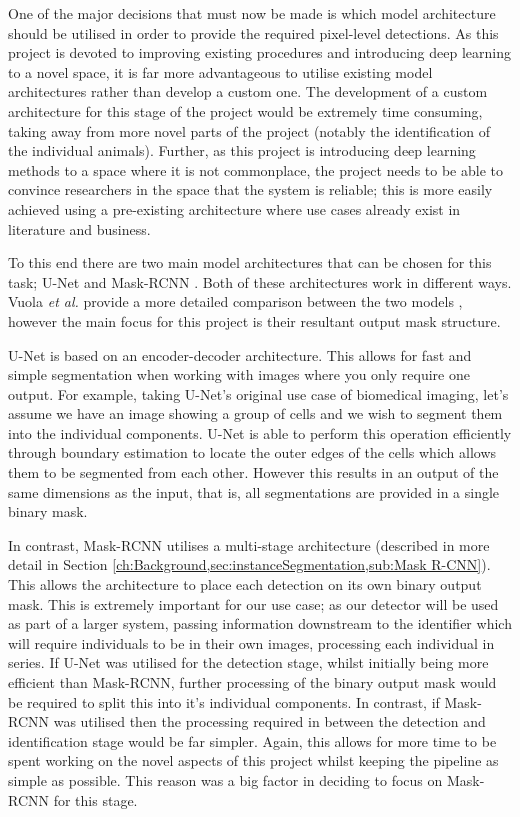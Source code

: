 One of the major decisions that must now be made is which model architecture should be utilised in order to provide the required pixel-level detections. As this project is devoted to improving existing procedures and introducing deep learning to a novel space, it is far more advantageous to utilise existing model architectures rather than develop a custom one. The development of a custom architecture for this stage of the project would be extremely time consuming, taking away from more novel parts of the project (notably the identification of the individual animals). Further, as this project is introducing deep learning methods to a space where it is not commonplace, the project needs to be able to convince researchers in the space that the system is reliable; this is more easily achieved using a pre-existing architecture where use cases already exist in literature and business. 

To this end there are two main model architectures that can be chosen for this task; U-Net \cite{ronneberger_u-net_2015} and Mask-RCNN \cite{he_mask_2017}. Both of these architectures work in different ways. Vuola \textit{et al.} provide a more detailed comparison between the two models \cite{vuola_mask-rcnn_2019}, however the main focus for this project is their resultant output mask structure. 

U-Net is based on an encoder-decoder architecture. This allows for fast and simple segmentation when working with images where you only require one output. For example, taking U-Net's original use case of biomedical imaging, let's assume we have an image showing a group of cells and we wish to segment them into the individual components. U-Net is able to perform this operation efficiently through boundary estimation to locate the outer edges of the cells which allows them to be segmented from each other. However this results in an output of the same dimensions as the input, that is, all segmentations are provided in a single binary mask. 

In contrast, Mask-RCNN utilises a multi-stage architecture (described in more detail in Section \ref{ch:Background,sec:instanceSegmentation,sub:Mask R-CNN}). This allows the architecture to place each detection on its own binary output mask. This is extremely important for our use case; as our detector will be used as part of a larger system, passing information downstream to the identifier which will require individuals to be in their own images, processing each individual in series. If U-Net was utilised for the detection stage, whilst initially being more efficient than Mask-RCNN, further processing of the binary output mask would be required to split this into it's individual components. In contrast, if Mask-RCNN was utilised then the processing required in between the detection and identification stage would be far simpler. Again, this allows for more time to be spent working on the novel aspects of this project whilst keeping the pipeline as simple as possible. This reason was a big factor in deciding to focus on Mask-RCNN for this stage.

